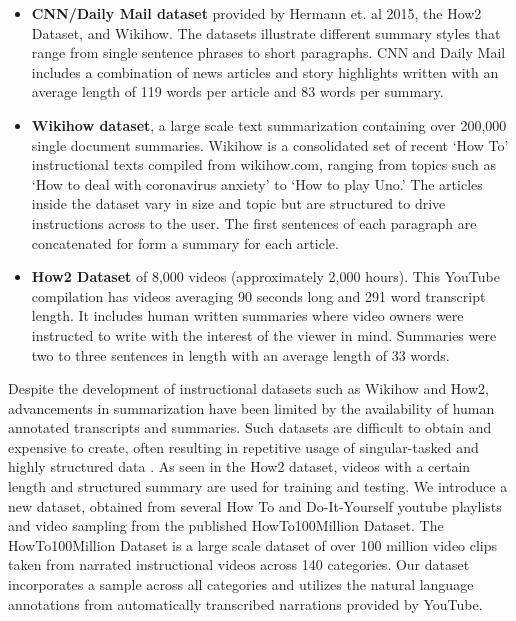\documentclass{article}
\begin{document}
\begin{itemize}

\item \textbf{CNN/Daily Mail dataset} provided by Hermann et. al 2015, the How2 Dataset, and Wikihow. The datasets illustrate different summary styles that range from single sentence phrases to short paragraphs. CNN and Daily Mail includes a combination of news articles and story highlights written with an average length of 119 words per article and 83 words per summary.
\item \textbf{Wikihow dataset}, a large scale text summarization containing over 200,000 single document summaries. Wikihow is a consolidated set of recent ‘How To’ instructional texts compiled from wikihow.com, ranging from topics such as ‘How to deal with coronavirus anxiety’ to ‘How to play Uno.’ The articles inside the dataset vary in size and topic but are structured to drive instructions across to the user. The first sentences of each paragraph are concatenated for form a summary for each article. 
\item \textbf{How2 Dataset} of 8,000 videos (approximately 2,000 hours). This YouTube compilation has videos averaging 90 seconds long and 291 word transcript length. It includes human written summaries where video owners were instructed to write with the interest of the viewer in mind. Summaries were two to three sentences in length with an average length of 33 words. 

\end{itemize}

Despite the development of instructional datasets such as Wikihow and How2, advancements in summarization have been limited by the availability of human annotated transcripts and summaries. Such datasets are difficult to obtain and expensive to create, often resulting in repetitive usage of singular-tasked and highly structured data . As seen in the How2 dataset, videos with a certain length and structured summary are used for training and testing. We introduce a new dataset, obtained from several How To and Do-It-Yourself youtube playlists and video sampling from the published HowTo100Million Dataset. The HowTo100Million Dataset is a large scale dataset of over 100 million video clips taken from narrated instructional videos across 140 categories. Our dataset incorporates a sample across all categories and utilizes the natural language annotations from automatically transcribed narrations provided by YouTube.
\end{document}

